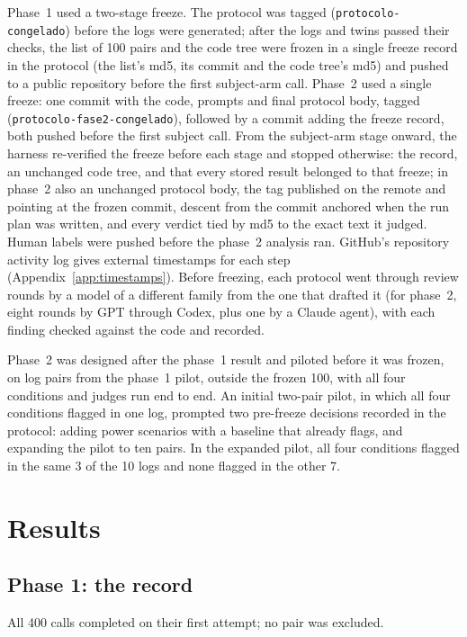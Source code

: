 \documentclass[11pt]{article}
\begin{document}
Phase~1 used a two-stage freeze. The protocol was tagged (\texttt{protocolo-congelado})
before the logs were generated; after the logs and twins passed their checks, the list
of 100 pairs and the code tree were frozen in a single freeze record in the protocol
(the list's md5, its commit and the code tree's md5) and pushed to a public repository
before the first subject-arm call. Phase~2 used a single freeze: one commit with the
code, prompts and final protocol body, tagged (\texttt{protocolo-fase2-congelado}),
followed by a commit adding the freeze record, both pushed before the first subject
call. From the subject-arm stage onward, the harness re-verified the freeze before each
stage and stopped otherwise: the record, an unchanged code tree, and that every stored
result belonged to that freeze; in phase~2 also an unchanged protocol body, the tag
published on the remote and pointing at the frozen commit, descent from the commit
anchored when the run plan was written, and every verdict tied by md5 to the exact text
it judged. Human labels were pushed before the phase~2 analysis ran. GitHub's
repository activity log gives external timestamps for each step
(Appendix~\ref{app:timestamps}). Before freezing, each protocol went through review
rounds by a model of a different family from the one that drafted it (for phase~2,
eight rounds by GPT through Codex, plus one by a Claude agent), with each finding
checked against the code and recorded.

Phase~2 was designed after the phase~1 result and piloted before it was frozen, on
log pairs from the phase~1 pilot, outside the frozen 100, with all four conditions and
judges run end to end. An initial two-pair pilot, in which all four conditions flagged
in one log, prompted two pre-freeze decisions recorded in the protocol: adding power
scenarios with a baseline that already flags, and expanding the pilot to ten pairs. In
the expanded pilot, all four conditions flagged in the same 3 of the 10 logs and none
flagged in the other 7.

\section{Results}

\subsection{Phase 1: the record}

All 400 calls completed on their first attempt; no pair was excluded.
\end{document}
